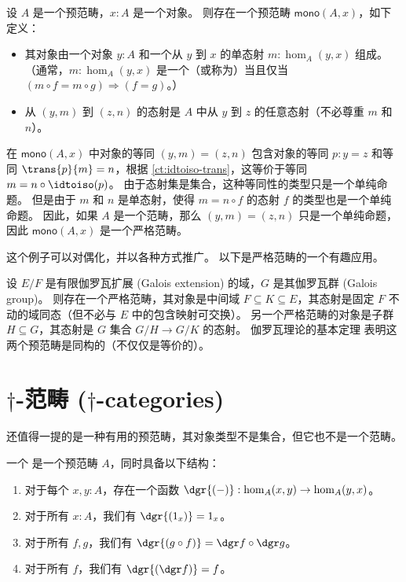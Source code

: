 \begin{eg}\label{ct:mono-cat}
设 $A$ 是一个预范畴，$x:A$ 是一个对象。
则存在一个预范畴 $\mathsf{mono}(A,x)$，如下定义：
\begin{itemize}
  \item 其对象由一个对象 $y:A$ 和一个从 $y$ 到 $x$ 的单态射 $m:\hom_A(y,x)$ 组成。
  （通常，$m:\hom_A(y,x)$ 是一个（或称为）当且仅当 $(m\circ f = m\circ g) \Rightarrow (f=g)$。）
  \item 从 $(y,m)$ 到 $(z,n)$ 的态射是 $A$ 中从 $y$ 到 $z$ 的任意态射（不必尊重 $m$ 和 $n$）。
\end{itemize}
在 $\mathsf{mono}(A,x)$ 中对象的等同 $(y,m)=(z,n)$ 包含对象的等同 $p:y=z$ 和等同 $\trans{p}{m}=n$，根据 \cref{ct:idtoiso-trans}，这等价于等同 $m=n\circ \idtoiso(p)$。
由于态射集是集合，这种等同性的类型只是一个单纯命题。
但是由于 $m$ 和 $n$ 是单态射，使得 $m = n\circ f$ 的态射 $f$ 的类型也是一个单纯命题。
因此，如果 $A$ 是一个范畴，那么 $(y,m)=(z,n)$ 只是一个单纯命题，因此 $\mathsf{mono}(A,x)$ 是一个严格范畴。
\end{eg}

这个例子可以对偶化，并以各种方式推广。
以下是严格范畴的一个有趣应用。

\begin{eg}\label{ct:galois}
设 $E/F$ 是有限伽罗瓦扩展 (Galois extension)
%
的域，$G$ 是其伽罗瓦群 (Galois group)。
%
则存在一个严格范畴，其对象是中间域 $F\subseteq K\subseteq E$，其态射是固定 $F$ 不动的域同态（但不必与 $E$ 中的包含映射可交换）。
另一个严格范畴的对象是子群 $H\subseteq G$，其态射是 $G$ 集合 $G/H \to G/K$ 的态射。
伽罗瓦理论的基本定理
%
表明这两个预范畴是同构的（不仅仅是等价的）。
\end{eg}

%

\section{\texorpdfstring{$\dagger$}{†}-范畴 ($\dagger$-categories)}
\label{sec:dagger-categories}

还值得一提的是一种有用的预范畴，其对象类型不是集合，但它也不是一个范畴。

\begin{defn}\label{ct:dagger-precategory}
一个
%
%
是一个预范畴 $A$，同时具备以下结构：
\begin{enumerate}
  \item 对于每个 $x,y:A$，存在一个函数 $\dgr{(-)}:\hom_A(x,y) \to \hom_A(y,x)$。
  \item 对于所有 $x:A$，我们有 $\dgr{(1_x)} = 1_x$。
  \item 对于所有 $f,g$，我们有 $\dgr{(g\circ f)} = \dgr f \circ \dgr g$。
  \item 对于所有 $f$，我们有 $\dgr{(\dgr f)} = f$。
\end{enumerate}
\end{defn}

